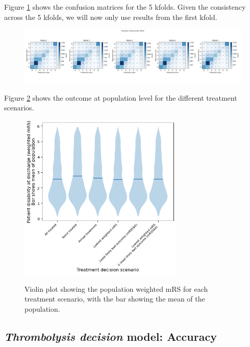 Figure \ref{fig:confusion_mrs} shows the confusion matrices for the 5 kfolds. Given the consistency across the 5 kfolds, we will now only use results from the first kfold.
\begin{figure}[!h]
    \centering
    \includegraphics[width=1\textwidth]{./images/040_xgb_7_features_5fold_confusion_matrices_per_kfold.jpg}\\
    \caption{}
    \label{fig:confusion_mrs}
\end{figure}


Figure \ref{fig:violin_population_mRS} shows the outcome at population level for the different treatment scenarios.

\begin{figure}[!h]
    \centering
    \includegraphics[width=0.7\textwidth]{./images/210_violin_population_weighted_mRS_per_treatment_scenario.png}\\
    \caption{Violin plot showing the population weighted mRS for each treatment scenario, with the bar showing the mean of the population.}
    \label{fig:violin_population_mRS}
\end{figure}


\subsection{\textit{Thrombolysis decision} model: Accuracy}

